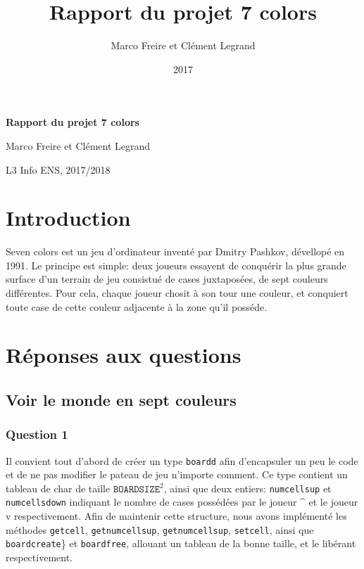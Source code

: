 \documentclass[12pt,a4paper,twoside]{article}
\author{Marco Freire et Clément Legrand}
\date{2017}
\title{Rapport du projet 7 colors}
\let\oldmaketitle=\maketitle
\def\maketitle{}
\begin{document}
\maketitle
\renewcommand{\v}[1]{\ensuremath{\overrightarrow{#1}}\xspace}
\let\oldcite=\cite
\def\cite#1{~\oldcite{#1}\xspace}
\let\oldref=\ref
\def\ref#1{~\oldref{#1}\xspace}
\let\oldeqref=\eqref
\def\eqref#1{~\oldeqref{#1}\xspace}
\let\leq=\leqslant
\let\geq=\geqslant
\let\le=\leqslant
\let\ge=\geqslant
\def\R{\ensuremath{\mathbb{R}}\xspace}
\pagestyle{empty} 
\let\maketitle=\oldmaketitle

\pagestyle{fancy}
\fancyhead{}
\fancyfoot{}
\lhead[\thepage]{\sffamily\itshape \leftmark}

\begin{center}
\bgroup\bf \LARGE Rapport du projet 7 colors\egroup\medskip

\large Marco Freire et Clément Legrand \smallskip

\normalsize L3 Info ENS, 2017/2018
\end{center}

\section{Introduction}
\label{sec:orgheadline1}
Seven colors est un jeu d'ordinateur inventé par Dmitry Pashkov,
dévellopé en 1991. Le principe est simple: deux joueurs essayent de
conquérir la plus grande surface d'un terrain de jeu consistué de
cases juxtaposées, de sept couleurs différentes. Pour cela, chaque
joueur chosit à son tour une couleur, et conquiert toute case de
cette couleur adjacente à la zone qu'il posséde.

\section{Réponses aux questions}
\label{sec:orgheadline25}
\subsection{Voir le monde en sept couleurs}
\label{sec:orgheadline9}
\subsubsection*{Question 1}
\label{sec:orgheadline2}
Il convient tout d'abord de créer un type \texttt{boardd} afin
d'encapsuler un peu le code et de ne pas modifier le pateau de jeu
n'importe comment. Ce type contient un tableau de char de taille
\(\texttt{BOARDSIZE} ^{2}\), ainsi que deux entiers:
\texttt{numcellsup} et \texttt{numcellsdown} indiquant le nombre de
cases possédées par le joueur \^{} et le joueur v respectivement.
Afin de maintenir cette structure, nous avons implémenté les
méthodes \texttt{getcell}, \texttt{getnumcellsup},
\texttt{getnumcellsup}, \texttt{setcell}, ainsi que
\texttt{boardcreate}\} et \texttt{boardfree}, allouant un tableau de
la bonne taille, et le libérant respectivement. 
\end{document}
